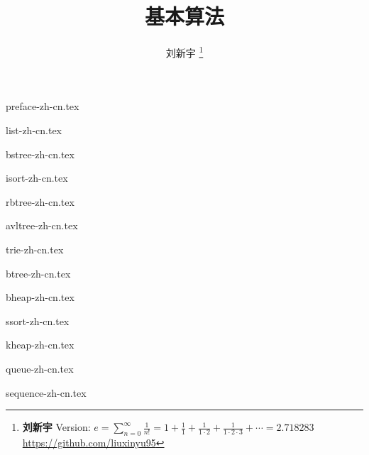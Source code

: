 \documentclass[zihao=5, b5paper, twoside, heading=true, punct=kaiming]{ctexbook}
\begin{document}


\title{
  {\bf \Huge 基本算法}
  \centering
}

\author{刘新宇
  \thanks{{\bfseries 刘新宇} \newline
    Version: $\displaystyle e = \sum \limits _{n=0}^{\infty }{\frac {1}{n!}} = 1 + {\frac {1}{1}}+{\frac {1}{1\cdot 2}}+{\frac {1}{1\cdot 2\cdot 3}}+\cdots = 2.718283$ \newline
    \url{https://github.com/liuxinyu95} \newline
    }}

\maketitle

\frontmatter
{preface-zh-cn.tex}
\newpage

\tableofcontents

\mainmatter

{list-zh-cn.tex}

{bstree-zh-cn.tex}

{isort-zh-cn.tex}

{rbtree-zh-cn.tex}

{avltree-zh-cn.tex}

{trie-zh-cn.tex}

{btree-zh-cn.tex}

{bheap-zh-cn.tex}

{ssort-zh-cn.tex}

{kheap-zh-cn.tex}

{queue-zh-cn.tex}

{sequence-zh-cn.tex}
\end{document}

